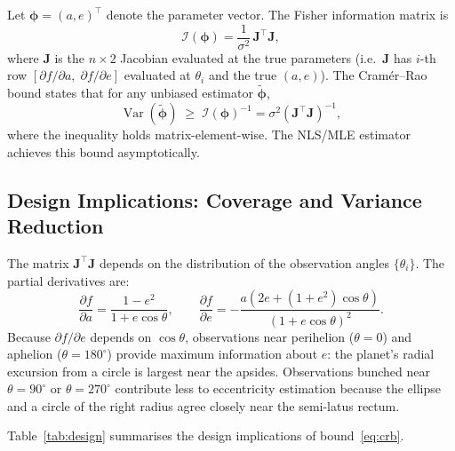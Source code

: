 \documentclass[12pt]{article}
\begin{document}
Let $\boldsymbol\phi=(a,e)^{\top}$ denote the parameter vector.
The Fisher information matrix is
\[
  \mathcal{I}(\boldsymbol\phi) = \frac{1}{\sigma^{2}}\,\mathbf{J}^{\top}\mathbf{J},
\]
where $\mathbf{J}$ is the $n\times2$ Jacobian evaluated at the true
parameters (i.e.\ $\mathbf{J}$ has $i$-th row
$[\partial f/\partial a,\;\partial f/\partial e]$ evaluated at $\theta_{i}$
and the true $(a,e)$).
The Cram\'er--Rao bound states that for any unbiased estimator
$\tilde{\boldsymbol\phi}$,
\begin{equation}\label{eq:crb}
  \operatorname{Var}(\tilde{\boldsymbol\phi})
  \;\geq\;
  \mathcal{I}(\boldsymbol\phi)^{-1}
  = \sigma^{2}(\mathbf{J}^{\top}\mathbf{J})^{-1},
\end{equation}
where the inequality holds matrix-element-wise.
The NLS/MLE estimator achieves this bound asymptotically.

\subsection{Design Implications: Coverage and Variance Reduction}

The matrix $\mathbf{J}^{\top}\mathbf{J}$ depends on the distribution of the
observation angles $\{\theta_{i}\}$.
The partial derivatives are:
\[
  \frac{\partial f}{\partial a} = \frac{1-e^{2}}{1+e\cos\theta},
  \qquad
  \frac{\partial f}{\partial e} = -\frac{a(2e+(1+e^{2})\cos\theta)}{(1+e\cos\theta)^{2}}.
\]
Because $\partial f/\partial e$ depends on $\cos\theta$, observations near
perihelion ($\theta=0$) and aphelion ($\theta=180^{\circ}$) provide maximum
information about $e$: the planet's radial excursion from a circle is largest
near the apsides.
Observations bunched near $\theta=90^{\circ}$ or $\theta=270^{\circ}$
contribute less to eccentricity estimation because the ellipse and a circle
of the right radius agree closely near the semi-latus rectum.

Table~\ref{tab:design} summarises the design implications of
bound~\eqref{eq:crb}.
\end{document}
